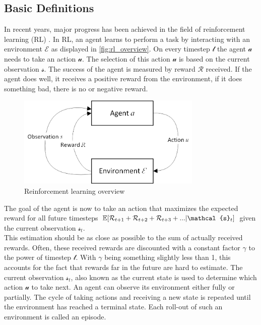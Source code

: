\subsection*{Basic Definitions}\label{basic_rl_definitions}
In recent years, major progress has been achieved in the field of reinforcement learning (RL) \cite{mnih2013playing,alphazero,hideandseek}.
In RL, an agent learns to perform a task by interacting with an environment $\mathcal{E}$ as displayed in \autoref{fig:rl_overview}. On every timestep $\mathcal{t}$ the agent $\mathcal{a}$ needs to take an action $\mathcal{u}$. The selection of this action $\mathcal{u}$ is based on the current observation $\mathcal{s}$. The success of the agent is measured by reward $\mathcal{R}$ received. If the agent does well, it receives a positive reward from the environment, if it does something bad, there is no or negative reward.
\begin{figure}[H]
	\centering
	\includegraphics[width=250pt]{images/rl_overview.png}
	\caption{Reinforcement learning overview}
	\label{fig:rl_overview}
\end{figure}
The goal of the agent is now to take an action that maximizes the expected reward for all future timesteps $\EX[\mathcal{R}_{t+1}+\mathcal{R}_{t+2}+\mathcal{R}_{t+3}+...|\mathcal{s}_{t}]$ given the current observation $\mathcal{s}_{t}$.\\
This estimation should be as close as possible to the sum of actually received rewards. Often, these received rewards are discounted with a constant factor $\mathcal{\gamma}$ to the power of timestep $\mathcal{t}$. With $\mathcal{\gamma}$ being something slightly less than 1, this accounts for the fact that rewards far in the future are hard to estimate.
The current observation $\mathcal{s}_{t}$, also known as the current state is used to determine which action $\mathcal{u}$ to take next. An agent can observe its environment either fully or partially. The cycle of taking actions and receiving a new state is repeated until the environment has reached a terminal state. Each roll-out of such an environment is called an episode.
